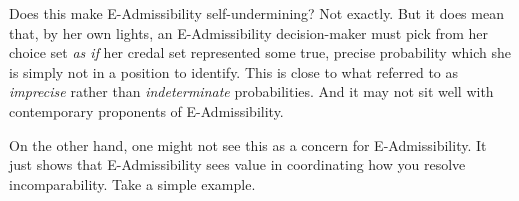 \documentclass[a4paper]{article}
\newcommand\EU{\mathrm{EU}}
\newcommand{\IB}{\mathbb{B}}
\renewcommand{\color}[1]{}
\newenvironment{colored}[1]{\leavevmode\color{#1}}{}
\newenvironment{CCM rewritten}
{\begingroup\color{blue}} %
{\endgroup}              %
\begin{document}



Does this make E-Admissibility self-undermining? Not exactly. But it does mean that, by her own lights, an E-Admissibility decision-maker must pick from her choice set \emph{as if} her credal set represented some true, precise probability which she is simply not in a position to identify. This is close to what \cite{levi99} referred to as \emph{imprecise} rather than \emph{indeterminate} probabilities. And it may not sit well with contemporary proponents of E-Admissibility.



	
	
	On the other hand, one might not see this as a concern for E-Admissibility. %
It just shows that E-Admissibility sees value in coordinating how you resolve incomparability.
Take a simple example.
	
\end{document}
